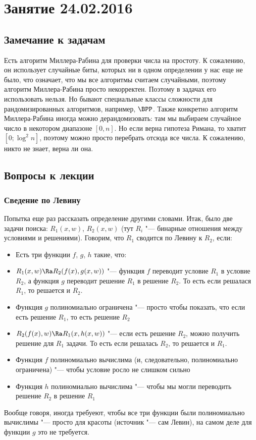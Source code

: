 \chapter{Занятие 24.02.2016}
\section{Замечание к задачам}
	Есть алгоритм Миллера-Рабина для проверки числа на простоту.
	К сожалению, он использует случайные биты, которых ни в одном определении у нас еще не было,
	что означает, что мы все алгоритмы считаем случайными, поэтому алгоритм Миллера-Рабина просто некорректен.
	Поэтому в задачах его использовать нельзя.
	Но бывают специальные классы сложности для рандомизированных алгоритмов, например, $\BPP$.
	Также конкретно алгоритм Миллера-Рабина иногда можно дерандомизовать: там мы выбираем
	случайное число в некотором диапазоне $[0, n]$.
	Но если верна гипотеза Римана, то хватит $[0; \log^2 n]$, поэтому можно просто перебрать отсюда все числа.
	К сожалению, никто не знает, верна ли она.

\section{Вопросы к лекции}
\subsection{Сведение по Левину}
	Попытка еще раз рассказать определение другими словами.
	Итак, было две задачи поиска: $R_1(x, w)$, $R_2(x, w)$ (тут $R_i$ "--- бинарные отношения между условиями и решениями).
	Говорим, что $R_1$ сводится по Левину к $R_2$, если:
	\begin{itemize}
		\item Есть три функции $f$, $g$, $h$ такие, что:
		\item
			$R_1(x, w) \Ra R_2(f(x), g(x, w))$ "--- функция $f$ переводит условие $R_1$ в условие $R_2$,
			а функция $g$ переводит решение $R_1$ в решение $R_2$.
			То есть если решалася $R_1$, то решается и $R_2$.
		\item
			Функция $g$ полиномиально ограничена "--- просто чтобы показать, что если есть решение $R_1$, то есть решение $R_2$
		\item
			$R_2(f(x), w) \Ra R_1(x, h(x, w))$ "--- если есть решение $R_2$, можно
			получить решение для $R_1$ задачи.
			То есть если решалась $R_2$, то решается и $R_1$.
		\item
			Функция $f$ полиномиально вычислима (и, следовательно, полиномиально ограничена) "--- чтобы условие росло не слишком сильно
		\item
			Функция $h$ полиномиально вычислима "--- чтобы мы могли переводить решение $R_2$ в решение $R_1$
	\end{itemize}
	Вообще говоря, иногда требуеют, чтобы все три функции были полиномиально вычислимы "--- просто для красоты
	(источник "--- сам Левин), на самом деле для функции $g$ это не требуется.

